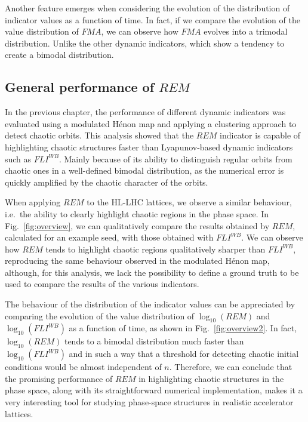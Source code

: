 Another feature emerges when considering the evolution of the distribution of indicator values as a function of time. In fact, if we compare the evolution of the value distribution of $FMA$, we can observe how $FMA$ evolves into a trimodal distribution. Unlike the other dynamic indicators, which show a tendency to create a bimodal distribution.

\subsection{General performance of $REM$}

In the previous chapter, the performance of different dynamic indicators was evaluated using a modulated Hénon map and applying a clustering approach to detect chaotic orbits. This analysis showed that the $REM$ indicator is capable of highlighting chaotic structures faster than Lyapunov-based dynamic indicators such as $FLI^{WB}$. Mainly because of its ability to distinguish regular orbits from chaotic ones in a well-defined bimodal distribution, as the numerical error is quickly amplified by the chaotic character of the orbits.

When applying $REM$ to the HL-LHC lattices, we observe a similar behaviour, i.e.\ the ability to clearly highlight chaotic regions in the phase space. In Fig.~\ref{fig:overview}, we can qualitatively compare the results obtained by $REM$, calculated for an example seed, with those obtained with $FLI^{WB}$. We can observe how $REM$ tends to highlight chaotic regions qualitatively sharper than $FLI^{WB}$, reproducing the same behaviour observed in the modulated Hénon map, although, for this analysis, we lack the possibility to define a ground truth to be used to compare the results of the various indicators.

The behaviour of the distribution of the indicator values can be appreciated by comparing the evolution of the value distribution of $\log_{10}(REM)$ and $\log_{10}(FLI^{WB})$ as a function of time, as shown in Fig.~\ref{fig:overview2}. In fact, $\log_{10}(REM)$ tends to a bimodal distribution much faster than $\log_{10}(FLI^{WB})$ and in such a way that a threshold for detecting chaotic initial conditions would be almost independent of $n$. Therefore, we can conclude that the promising performance of $REM$ in highlighting chaotic structures in the phase space, along with its straightforward numerical implementation, makes it a very interesting tool for studying phase-space structures in realistic accelerator lattices.

